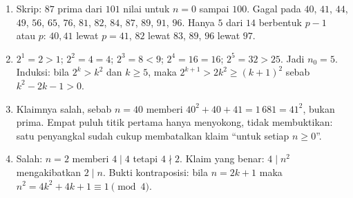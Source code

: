 \begin{enumerate}[label=\textbf{1.\arabic*}]
  \item Skrip: $87$ prima dari $101$ nilai untuk $n=0$ sampai $100$. Gagal pada
        $40$, $41$, $44$, $49$, $56$, $65$, $76$, $81$, $82$, $84$, $87$, $89$,
        $91$, $96$. Hanya $5$ dari $14$ berbentuk $p-1$ atau $p$: $40,41$ lewat
        $p=41$, $82$ lewat $83$, $89$, $96$ lewat $97$.

  \item $2^{1}=2>1$; $2^{2}=4=4$; $2^{3}=8<9$; $2^{4}=16=16$; $2^{5}=32>25$. Jadi
        $n_{0}=5$. Induksi: bila $2^{k}>k^{2}$ dan $k\ge 5$, maka
        $2^{k+1}>2k^{2}\ge(k+1)^{2}$ sebab $k^{2}-2k-1>0$.

  \item 
Klaimnya salah, sebab $n=40$ memberi $40^{2}+40+41=1\,681=41^{2}$, bukan
        prima. Empat puluh titik pertama hanya menyokong, tidak membuktikan: satu
        penyangkal sudah cukup membatalkan klaim ``untuk setiap $n\ge0$''.

  \item Salah: $n=2$ memberi $4\mid 4$ tetapi $4\nmid 2$. Klaim yang benar:
        $4\mid n^{2}$ mengakibatkan $2\mid n$. Bukti kontraposisi: bila
        $n=2k+1$ maka $n^{2}=4k^{2}+4k+1\equiv 1 \pmod 4$.
\end{enumerate}

